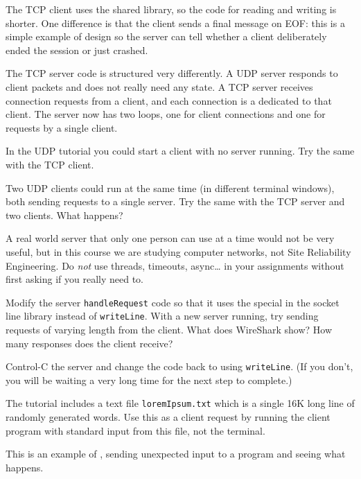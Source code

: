 The TCP client uses the shared library, so the code for reading and writing
is shorter. One difference is that the client sends a final message on EOF:
this is a simple example of  design so the server can tell
whether a client deliberately ended the session or just crashed.

The TCP server code is structured very differently. A UDP server responds
to client packets and does not really need any state. A TCP server receives
connection requests from a client, and each connection is a 
dedicated to that client. The server now has two loops, one for client connections
and one for requests by a single client.



In the UDP tutorial you could start a client with no server running. Try the
same with the TCP client.

Two UDP clients could run at the same time (in different terminal windows),
both sending requests to a single server. Try the same with the TCP server
and two clients. What happens?

\begin{IMPORTANT}
A real world server that only one person can use at a time would not be very
useful, but in this course we are studying computer networks, not Site
Reliability Engineering. Do \emph{not} use threads, timeouts, async\ldots
in your assignments without first asking if you really need to.
\end{IMPORTANT}

\STEP Modify the server \texttt{handleRequest} code so that it uses the special
 in the socket line library instead of \texttt{writeLine}.
With a new server running, try sending requests of varying length from the
client. What does WireShark show? How many responses does the client receive?

Control-C the server and change the code back to using \texttt{writeLine}.
(If you don't, you will be waiting a very long time for the next step to
complete.)

\STEP The tutorial includes a text file \texttt{loremIpsum.txt} which is a
single 16K long line of randomly generated words. Use this as a client
request by running the client program with standard input from this file,
not the terminal.

\begin{IMPORTANT}
This is an example of , sending unexpected input to a program
and seeing what happens.
\end{IMPORTANT}

